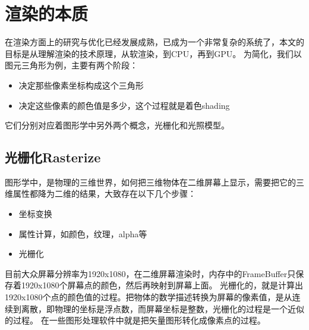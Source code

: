 \section{渲染的本质}
在渲染方面上的研究与优化已经发展成熟，已成为一个非常复杂的系统了，本文的目标是从理解渲染的技术原理，从软渲染，到CPU，再到GPU。
为简化，我们以图元三角形为例，主要有两个阶段：
\begin{itemize}
    \item {决定那些像素坐标构成这个三角形}
    \item {决定这些像素的颜色值是多少，这个过程就是着色shading}
\end{itemize}
它们分别对应着图形学中另外两个概念，光栅化和光照模型。

\subsection{光栅化Rasterize}

图形学中，是物理的三维世界，如何把三维物体在二维屏幕上显示，需要把它的三维属性都降为二维的结果，大致存在以下几个步骤：

\begin{itemize}
    \item {坐标变换}
    \item {属性计算，如颜色，纹理，alpha等}
    \item {光栅化}
\end{itemize}

目前大众屏幕分辨率为1920x1080，在二维屏幕渲染时，内存中的FrameBuffer只保存着1920x1080个屏幕点的颜色，然后再映射到屏幕上面。
光栅化的，就是计算出1920x1080个点的颜色值的过程。把物体的数学描述转换为屏幕的像素值，是从连续到离散，即物理的坐标是浮点数，而屏幕坐标是整数，光栅化的过程是一个近似的过程。
在一些图形处理软件中就是把矢量图形转化成像素点的过程。

